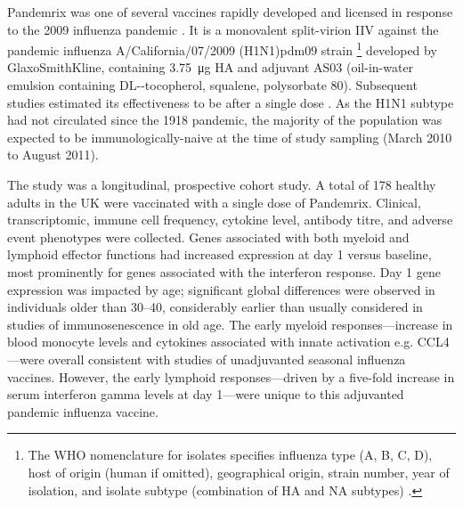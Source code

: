 Pandemrix was one of several vaccines rapidly developed and licensed in response to the 2009 influenza pandemic \autocite{broadbent2011InfluenzaVirusVaccines}.
It is a monovalent split-virion \gls{IIV} against the pandemic influenza A/California/07/2009 (H1N1)pdm09 strain%
\footnote{
    The \gls{WHO} nomenclature for isolates specifies influenza type (A, B, C, D), host of origin (human if omitted), geographical origin, strain number, year of isolation, and isolate subtype (combination of \gls{HA} and \gls{NA} subtypes) \autocite{worldhealthorganization1980RevisionSystemNomenclature}.
}
developed by GlaxoSmithKline,
containing \SI{3.75}{\micro\gram} \gls{HA}
and adjuvant AS03 (oil-in-water emulsion containing DL-\textalpha-tocopherol, squalene, polysorbate 80).
Subsequent studies estimated its effectiveness to be  after a single dose \autocite{syrjanen2014EffectivenessPandemicSeasonal}.
As the H1N1 subtype had not circulated since the 1918 pandemic, the majority of the population was expected to be immunologically-naive at the time of study sampling (March 2010 to August 2011).

The study was a longitudinal, prospective cohort study.
A total of 178 healthy adults in the UK were vaccinated with a single dose of Pandemrix.
Clinical, transcriptomic, immune cell frequency, cytokine level, antibody titre, and adverse event phenotypes were collected.
Genes associated with both myeloid and lymphoid effector functions had increased expression at day 1 versus baseline, 
most prominently for genes associated with the interferon response.
Day 1 gene expression was impacted by age;
significant global differences were observed in individuals older than \SIrange{30}{40}{\year}, 
considerably earlier than usually considered in studies of immunosenescence in old age.
The early myeloid responses---increase in blood monocyte levels and cytokines associated with innate activation e.g. CCL4---were overall consistent with studies of unadjuvanted seasonal influenza vaccines.
However, the early lymphoid responses---driven by a five-fold increase in serum interferon gamma levels at day 1---were unique to this adjuvanted pandemic influenza vaccine.

